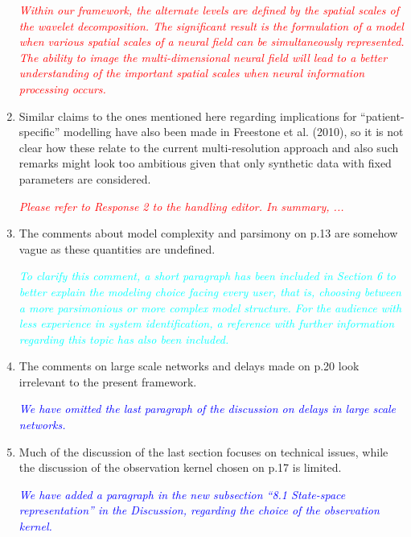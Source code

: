 \documentclass{article}
\newcommand{\dean}[1]{\textcolor{red}{#1}}
\newcommand{\parham}[1]{\textcolor{blue}{#1}}
\newcommand{\ken}[1]{\textcolor{cyan}{#1}}
\begin{document}
\begin{enumerate}
\dean{\emph{Within our framework, the alternate levels are defined by the spatial scales of the wavelet decomposition. The significant result is the formulation of a model when various spatial scales of a neural field can be simultaneously represented. The ability to image the multi-dimensional neural field will lead to a better understanding of the important spatial scales when neural information processing occurs.  }}

				\item Similar claims to the ones mentioned here regarding implications for ``patient-specific'' modelling have also been made in Freestone et al. (2010), so it is not clear how these relate to the current multi-resolution approach and also such remarks might look too ambitious given that only synthetic data with fixed parameters are considered.
				
				\dean{\emph{Please refer to Response 2 to the handling editor. In summary, ... }}
				
				\item The comments about model complexity and parsimony on p.13 are somehow vague as these quantities are undefined.
				
				
				\emph{\ken{To clarify this comment, a short paragraph has been included in Section 6 to better explain the modeling choice facing every user, that is, choosing between a more parsimonious or more complex model structure.  For the audience with less experience in system identification, a reference with further information regarding this topic has also been included.}}
				
				\item The comments on large scale networks and delays made on p.20 look irrelevant to the present framework.
				
				\emph{\parham{We have omitted the last paragraph of the discussion on delays in large scale networks.}}
				
				\item Much of the discussion of the last section focuses on technical issues, while the discussion of the observation kernel chosen on p.17 is limited.
				
				\emph{\parham{We have added a paragraph in the new subsection ``8.1 State-space representation'' in the Discussion, regarding the choice of the observation kernel.}}

    \end{enumerate}
    
\end{document}
